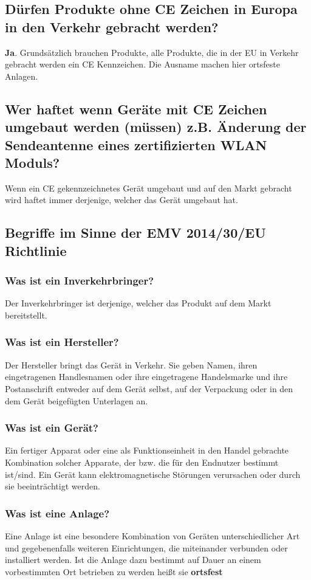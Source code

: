 \subsection{Dürfen Produkte ohne CE Zeichen in Europa in den Verkehr gebracht werden?}
\textbf{Ja}. Grundsätzlich brauchen Produkte, alle Produkte, die in der EU in Verkehr gebracht werden ein CE Kennzeichen.\p
Die Ausname machen hier ortsfeste Anlagen.

\subsection{Wer haftet wenn Geräte mit CE Zeichen umgebaut werden (müssen) z.B. Änderung der Sendeantenne eines zertifizierten WLAN Moduls?}
Wenn ein CE gekennzeichnetes Gerät umgebaut und auf den Markt gebracht wird haftet immer derjenige, welcher das Gerät umgebaut hat.

\subsection{Begriffe im Sinne der EMV 2014/30/EU Richtlinie}
\subsubsection{Was ist ein Inverkehrbringer?}
Der Inverkehrbringer ist derjenige, welcher das Produkt auf dem Markt bereitstellt.

\subsubsection{Was ist ein Hersteller?}
Der Hersteller bringt das Gerät in Verkehr. Sie geben Namen, ihren eingetragenen Handlesnamen oder ihre eingetragene Handelsmarke und ihre Postanschrift entweder auf dem Gerät selbst, auf der Verpackung oder in den dem Gerät beigefügten Unterlagen an.

\subsubsection{Was ist ein Gerät?}
Ein fertiger Apparat oder eine als Funktionseinheit in den Handel gebrachte Kombination solcher Apparate, der bzw. die für den Endnutzer bestimmt ist/sind. Ein Gerät kann elektromagnetische Störungen verursachen oder durch sie beeinträchtigt werden.

\subsubsection{Was ist eine Anlage?}
Eine Anlage ist eine besondere Kombination von Geräten unterschiedlicher Art und gegebenenfalls weiteren Einrichtungen, die miteinander verbunden oder installiert werden.\p
Ist die Anlage dazu bestimmt auf Dauer an einem vorbestimmten Ort betrieben zu werden heißt sie \textbf{ortsfest}

